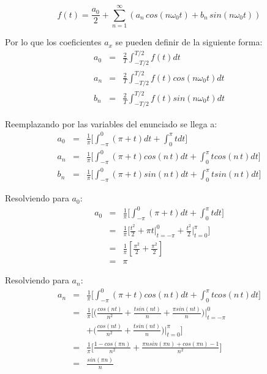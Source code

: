 \documentclass[twocolumn]{article}
\begin{document}
$$f(t) = \frac{a_0}{2} + \sum_{n=1}^\infty\left(a_n\,cos(n\omega_0t) + b_n\,sin(n\omega_0t)\right)$$

Por lo que los coeficientes $a_x$ se pueden definir de la siguiente forma:
\begin{eqnarray*}
a_0 &=& \frac{2}{T}\int_{-T/2}^{T/2}f(t)dt\\
a_n &=& \frac{2}{T}\int_{-T/2}^{T/2}f(t)cos(n\omega_0t)dt\\
b_n &=& \frac{2}{T}\int_{-T/2}^{T/2}f(t)sin(n\omega_0t)dt
\end{eqnarray*}

Reemplazando por las variables del enunciado se llega a:
\begin{eqnarray*}
a_0 &=& \frac{1}{\pi} \bigg[ \int_{-\pi}^{0}(\pi + t) dt + \int_{0}^{\pi}t dt \bigg] \\
a_n &=&\frac{1}{\pi} \bigg[ \int_{-\pi}^{0}(\pi + t)cos(n\,t) dt + \int_{0}^{\pi}tcos(n\,t) dt \bigg] \\
b_n &=& \frac{1}{\pi} \bigg[ \int_{-\pi}^{0}(\pi + t)sin(n\,t) dt + \int_{0}^{\pi}tsin(n\,t) dt \bigg]
\end{eqnarray*}

Resolviendo para $a_0$:
\begin{eqnarray*}
a_0 &=& \frac{1}{\pi} \bigg[ \int_{-\pi}^{0}(\pi + t) dt + \int_{0}^{\pi}t dt \bigg]\\
&=& \frac{1}{\pi} \bigg[ \frac{t^{2}}{2} + \pi t\bigg|_{t=-\pi}^{0} + \frac{t^{2}}{2}\bigg|_{t=0}^{\pi} \bigg] \\
&=& \frac{1}{\pi} [\frac{\pi^{2}}{2} + \frac{\pi^{2}}{2}]\\
&=& \pi
\end{eqnarray*}

Resolviendo para $a_n$:
\begin{eqnarray*}
a_n &=& \frac{1}{\pi} \bigg[ \int_{-\pi}^{0}(\pi + t)cos(n\,t) dt + \int_{0}^{\pi}tcos(n\,t) dt \bigg] \\
&=& \frac{1}{\pi} \bigg[ \bigg(\frac{cos(n t)}{n^{2}} + \frac{t sin(n t)}{n} + \frac{\pi sin(n t)}{n}\bigg)\bigg|_{t=-\pi}^{0}\\
& & + \bigg(\frac{cos(nt)}{n^{2}} + \frac{tsin(n t)}{n}\bigg)\bigg|_{t=0}^{\pi} \bigg] \\
&=& \frac{1}{\pi} \bigg[ \frac{1 - cos(\pi n)}{n^{2}}+ \frac{\pi n sin(\pi n)+ cos(\pi n) -1}{n^{2}} \bigg]\\
&=& \frac{sin(\pi n)}{n}
\end{eqnarray*}
\end{document}

